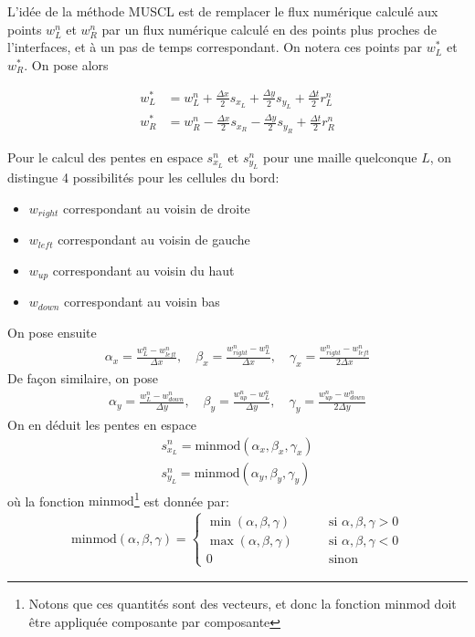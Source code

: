 \documentclass[
	french,
	11pt, %
]{fphw}
\begin{document}
L'idée de la méthode MUSCL est de remplacer le flux numérique calculé aux points $w^n_L$ et $w^n_R$ par un flux numérique calculé en des points plus proches de l'interfaces, et à un pas de temps correspondant. On notera ces points par $w^*_L$ et $w^*_R$. On pose alors


\begin{equation}	
	\label{eq:muscl}
	\begin{aligned}
		w^*_L &= w^n_L +  \frac{\Delta x}{2} s_{x_L} + \frac{\Delta y}{2} s_{y_L} + \frac{\Delta t}{2} r^n_{L} \\
		w^*_R &= w^n_R - \frac{\Delta x}{2} s_{x_R} - \frac{\Delta y}{2} s_{y_R} + \frac{\Delta t}{2} r^n_{R}
	\end{aligned}
\end{equation}

Pour le calcul des pentes en espace $s^n_{x_L}$ et $s^n_{y_L}$ pour une maille quelconque $L$, on distingue 4 possibilités pour les cellules du bord:
\begin{itemize}
	\item $w_{right}$ correspondant au voisin de droite 
	\item $w_{left}$ correspondant au voisin de gauche
	\item $w_{up}$ correspondant au voisin du haut
	\item $w_{down}$ correspondant au voisin bas 
\end{itemize}
On pose ensuite
\begin{align*}
	\alpha_x = \frac{w^n_L - w^n_{left}}{\Delta x}, \quad
	\beta _x = \frac{w^n_{right} - w^n_{L}}{\Delta x}, \quad
	\gamma _x = \frac{w^n_{right} - w^n_{left}}{2\Delta x}
\end{align*}
De façon similaire, on pose
\begin{align*}
	\alpha_y = \frac{w^n_L - w^n_{down}}{\Delta y}, \quad
	\beta _y = \frac{w^n_{up} - w^n_{L}}{\Delta y}, \quad
	\gamma _y = \frac{w^n_{up} - w^n_{down}}{2\Delta y}
\end{align*}
On en déduit les pentes en espace
\begin{align*}
	s^n_{x_L} = \text{minmod}(\alpha_x, \beta _x, \gamma _x) \\
	s^n_{y_L} = \text{minmod}(\alpha_y, \beta _y, \gamma _y)
\end{align*}
où la fonction $\text{minmod}$\footnote{Notons que ces quantités sont des vecteurs, et donc la fonction $\text{minmod}$ doit être appliquée composante par composante} est donnée par:
\begin{align*}
	\text{minmod}(\alpha, \beta, \gamma) = 
	\begin{cases}
		\min(\alpha, \beta, \gamma) \qquad &\text{si  } \alpha,\beta,\gamma > 0 \\
		\max(\alpha, \beta, \gamma) \qquad &\text{si  } \alpha,\beta,\gamma < 0 \\
		0 \qquad &\text{sinon  }
	\end{cases}
\end{align*}
\end{document}
